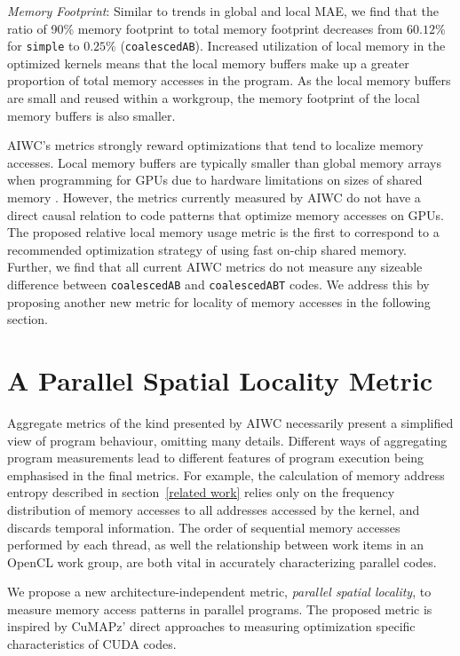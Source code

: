 \documentclass[review=false, sigchi]{acmart}
\begin{document}
	\textit{Memory Footprint}: Similar to trends in global and local MAE, we find that the ratio of 90\% memory footprint to total memory footprint decreases from $60.12\%$ for \texttt{simple} to $0.25\%$ (\texttt{coalescedAB}). Increased utilization of local memory in the optimized kernels means that the local memory buffers make up a greater proportion of total memory accesses in the program. As the local memory buffers are small and reused within a workgroup, the memory footprint of the local memory buffers is also smaller. 
	
	AIWC's metrics strongly reward optimizations that tend to localize memory accesses. 
	Local memory buffers are typically smaller than global memory arrays when programming for GPUs due to hardware limitations on sizes of shared memory \cite{cudamanual}. 
	However, the metrics currently measured by AIWC do not have a direct causal relation to code patterns that optimize memory accesses on GPUs. 
	The proposed relative local memory usage metric is the first to correspond to a recommended optimization strategy of using fast on-chip shared memory. 
	Further, we find that all current AIWC metrics do not measure any sizeable difference between \texttt{coalescedAB} and \texttt{coalescedABT} codes.%
	We address this by proposing another new metric for locality of memory accesses in the following section.
	
	\section{A Parallel Spatial Locality Metric} \label{discussion}
	
	Aggregate metrics of the kind presented by AIWC necessarily present a simplified view of program behaviour, omitting many details.
	Different ways of aggregating program measurements lead to different features of program execution being emphasised in the final metrics.
	For example, the calculation of memory address entropy described in section~\ref{related work} relies only on the frequency distribution of memory accesses to all addresses accessed by the kernel, and discards temporal information.
	The order of sequential memory accesses performed by each thread, as well the relationship between work items in an OpenCL work group, are both vital in accurately characterizing parallel codes.

	We propose a new architecture-independent metric, \emph{parallel spatial locality}, to measure memory access patterns in parallel programs.
	The proposed metric is inspired by CuMAPz' direct approaches to measuring optimization specific characteristics of CUDA codes.
	
\end{document}
